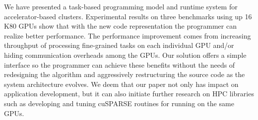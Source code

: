 We have presented a task-based programming model and runtime system for accelerator-based clusters.
Experimental results on three benchmarks using up 16 K80 GPUs show that with the new code representation the programmer can realize better performance.
The performance improvement comes from increasing throughput of processing fine-grained tasks on each individual GPU and/or hiding communication overheads among the GPUs.
Our solution offers a simple interface so the programmer can achieve these benefits without the needs of redesigning the algorithm and aggressively restructuring the source code as the system architecture evolves.
We deem that our paper not only has impact on application development, but it can also initiate further research on HPC libraries such as developing and tuning cuSPARSE routines for running on the same GPUs. 

